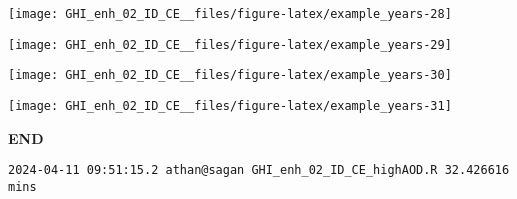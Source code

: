 \documentclass[
  10pt,
  a4paper,oneside]{article}
\begin{document}
\begin{center}\texttt{[image: GHI\_enh\_02\_ID\_CE\_\_files/figure-latex/example\_years-28]} \end{center}

\begin{center}\texttt{[image: GHI\_enh\_02\_ID\_CE\_\_files/figure-latex/example\_years-29]} \end{center}

\begin{center}\texttt{[image: GHI\_enh\_02\_ID\_CE\_\_files/figure-latex/example\_years-30]} \end{center}

\begin{center}\texttt{[image: GHI\_enh\_02\_ID\_CE\_\_files/figure-latex/example\_years-31]} \end{center}

\textbf{END}

\begin{verbatim}
2024-04-11 09:51:15.2 athan@sagan GHI_enh_02_ID_CE_highAOD.R 32.426616 mins
\end{verbatim}
\end{document}
